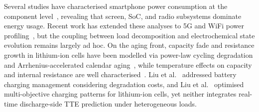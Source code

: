 \documentclass[5p,times,number]{elsarticle}
\begin{document}
Several studies have characterised smartphone power consumption at the component level~\cite{Carroll2010,Chen2014,Murmuria2012}, revealing that screen, SoC, and radio subsystems dominate energy usage.
Recent work has extended these analyses to 5G and WiFi power profiling~\cite{Xu2020,Lauridsen2014,Sun2018,Negri2006}, but the coupling between load decomposition and electrochemical state evolution remains largely ad hoc.
On the aging front, capacity fade and resistance growth in lithium-ion cells have been modelled via power-law cycling degradation and Arrhenius-accelerated calendar aging~\cite{Vetter2005,Wang2011JPS,Schmalstieg2014JPS,Whittingham2012,Li2019,Kou2017}, while temperature effects on capacity and internal resistance are well characterised~\cite{Ali2020,Chen2025,He2017,Tang2019ECM}.
Liu et al.~\cite{Liu2019ECM} addressed battery charging management considering degradation costs, and Liu et al.~\cite{Liu2018ECM} optimised multi-objective charging patterns for lithium-ion cells, yet neither integrates real-time discharge-side TTE prediction under heterogeneous loads.
\end{document}
